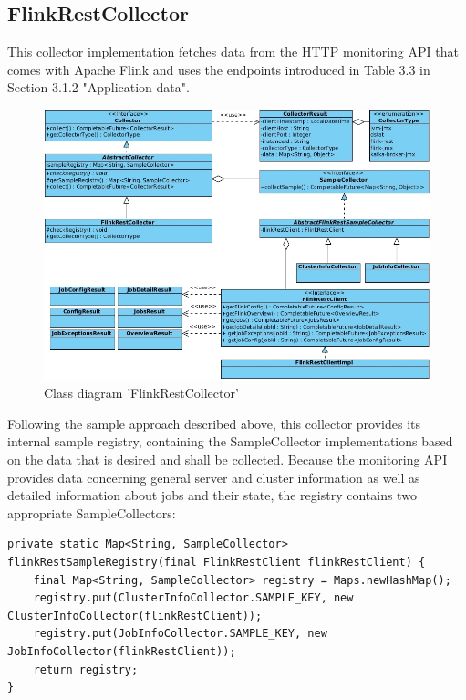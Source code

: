 \subsection{FlinkRestCollector}

This collector implementation fetches data from the HTTP monitoring API that comes with Apache Flink and uses the endpoints
introduced in Table 3.3 in Section 3.1.2 "Application data".

\begin{figure}[H]
	\centering
	\includegraphics[width=1.0\textwidth]{../uml/class-flink-rest-collector.jpg}
	\caption{Class diagram 'FlinkRestCollector'}
	\label{class-diagram-flink-rest-collector}
\end{figure}

Following the sample approach described above, this collector provides its internal sample registry, containing the SampleCollector
implementations based on the data that is desired and shall be collected. Because the monitoring API provides data concerning
general server and cluster information as well as detailed information about jobs and their state, the registry contains
two appropriate SampleCollectors:

\begin{lstlisting}[caption={"FlinkRestCollector" Sample registry}, captionpos=b, label={lst:flink-rest-collector-sample-registry}]
private static Map<String, SampleCollector> flinkRestSampleRegistry(final FlinkRestClient flinkRestClient) {
    final Map<String, SampleCollector> registry = Maps.newHashMap();
    registry.put(ClusterInfoCollector.SAMPLE_KEY, new ClusterInfoCollector(flinkRestClient));
    registry.put(JobInfoCollector.SAMPLE_KEY, new JobInfoCollector(flinkRestClient));
    return registry;
}
\end{lstlisting}

